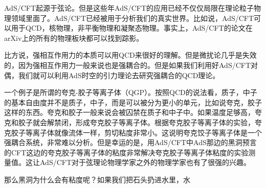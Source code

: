 
AdS/CFT起源于弦论。但是这些年AdS/CFT的应用已经不仅仅局限在理论粒子物理领域里面了。AdS/CFT已经被用于分析我们的真实世界。比如说，AdS/CFT可以用于QCD，核物理，非平衡物理和凝聚态物理。事实上，AdS/CFT的论文在arXiv上的所有的物理板块都可以找到踪影。

比方说，强相互作用力的本质可以用QCD来很好的理解。但是微扰论几乎是失效的，因为强相互作用力一般来说也是强耦合的。但是如果我们利用好AdS/CFT对偶，我们就可以利用AdS时空的引力理论去研究强耦合的QCD理论。

一个例子是所谓的夸克-胶子等离子体（QGP）。按照QCD的说法看，质子，中子的基本自由度并不是质子，中子，而是可以被分为更小的单元，比如说夸克，胶子这样的东西。夸克和胶子一般来说会被囚禁在质子和中子中。如果温度足够高，夸克和胶子就会解禁闭，形成夸克胶子等离子体。根据夸克胶子等离子体的实验，夸克胶子等离子体就像流体一样，剪切粘度非常小。这说明夸克饺子等离子体是一个强耦合系统，非常难以分析。但是幸运的是，用AdS/CFT中AdS那边的黑洞预言的CFT这边的夸克胶子等离子体的粘度非常解决夸克胶子等离子体粘度的实验测量值。这让AdS/CFT对于弦理论物理学家之外的物理学家也有了很强的兴趣。

那么黑洞为什么会有粘度呢？如果我们把石头扔进水里，水